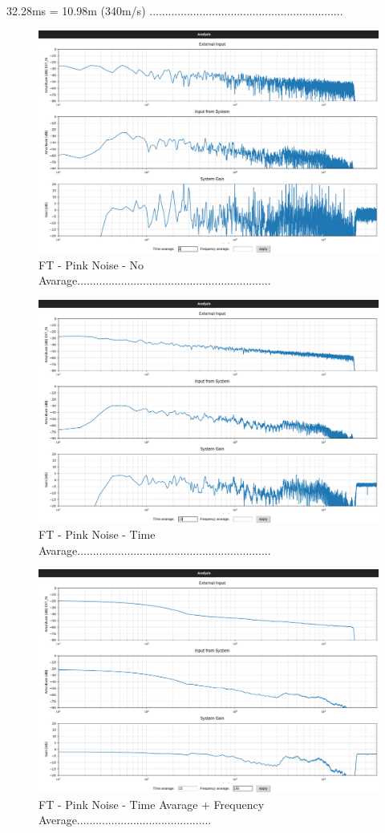 32.28ms = 10.98m (340m/s) ..............................................................

\begin{figure}[H]
	\centering
	\includegraphics[width=0.6
	\linewidth]{Figures/Coro_FT_NO_av.png}
	\caption{FT - Pink Noise - No Avarage..............................................................}
	\label{fig:Coro_FT_no_av}
\end{figure}

\begin{figure}[H]
	\centering
	\includegraphics[width=0.6
	\linewidth]{Figures/Coro_FT_time_av.png}
	\caption{FT - Pink Noise - Time Avarage..............................................................}
	\label{fig:Coro_FT_time_av}
\end{figure}

\begin{figure}[H]
	\centering
	\includegraphics[width=0.6
	\linewidth]{Figures/Coro_FT_WITH_av.png}
	\caption{FT - Pink Noise - Time Avarage + Frequency Average...........................................}
	\label{fig:Coro_FT_av}
\end{figure}

